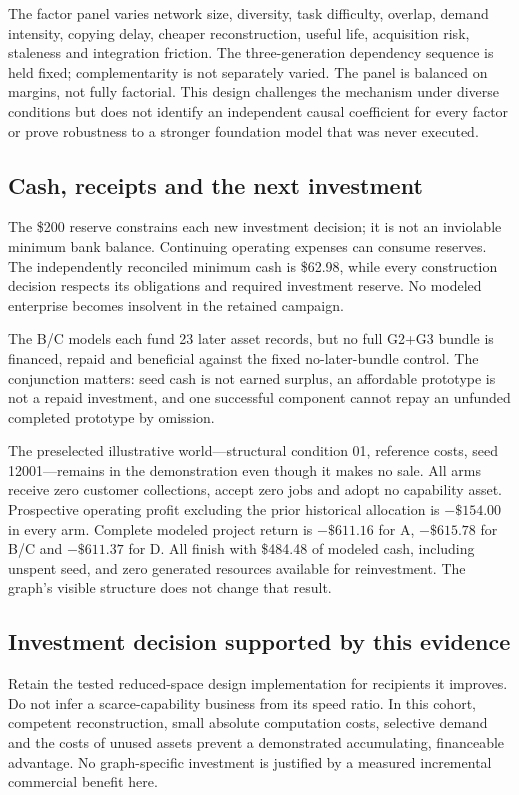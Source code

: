 The factor panel varies network size, diversity, task difficulty, overlap, demand intensity, copying delay, cheaper reconstruction, useful life, acquisition risk, staleness and integration friction. The three-generation dependency sequence is held fixed; complementarity is not separately varied. The panel is balanced on margins, not fully factorial. This design challenges the mechanism under diverse conditions but does not identify an independent causal coefficient for every factor or prove robustness to a stronger foundation model that was never executed.

\subsection{Cash, receipts and the next investment}

The \$200 reserve constrains each new investment decision; it is not an inviolable minimum bank balance. Continuing operating expenses can consume reserves. The independently reconciled minimum cash is \$62.98, while every construction decision respects its obligations and required investment reserve. No modeled enterprise becomes insolvent in the retained campaign.

The B/C models each fund 23 later asset records, but no full G2+G3 bundle is financed, repaid and beneficial against the fixed no-later-bundle control. The conjunction matters: seed cash is not earned surplus, an affordable prototype is not a repaid investment, and one successful component cannot repay an unfunded completed prototype by omission.

The preselected illustrative world---structural condition 01, reference costs, seed 12001---remains in the demonstration even though it makes no sale. All arms receive zero customer collections, accept zero jobs and adopt no capability asset. Prospective operating profit excluding the prior historical allocation is $-\$154.00$ in every arm. Complete modeled project return is $-\$611.16$ for A, $-\$615.78$ for B/C and $-\$611.37$ for D. All finish with \$484.48 of modeled cash, including unspent seed, and zero generated resources available for reinvestment. The graph's visible structure does not change that result.

\subsection{Investment decision supported by this evidence}

Retain the tested reduced-space design implementation for recipients it improves. Do not infer a scarce-capability business from its speed ratio. In this cohort, competent reconstruction, small absolute computation costs, selective demand and the costs of unused assets prevent a demonstrated accumulating, financeable advantage. No graph-specific investment is justified by a measured incremental commercial benefit here.

